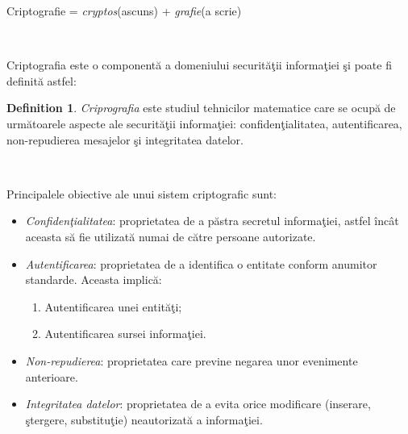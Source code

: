 \documentclass[11pt]{report}
\theoremstyle{plain}
\theoremstyle{definition}
\newtheorem{definition}{Definition}
\theoremstyle{definition}
\theoremstyle{proposition}
\begin{document}
\begin{center}
Criptografie = \textit{cryptos}(ascuns) + \textit{grafie}(a scrie)
\end{center}
\

Criptografia este o componentă a domeniului securităţii informaţiei şi poate fi definită astfel:

\begin{definition} \textit{Criprografia} este studiul tehnicilor matematice care se ocupă de următoarele aspecte ale securităţii informaţiei: confidenţialitatea, autentificarea, non-repudierea mesajelor şi integritatea datelor.
\end{definition}
\

Principalele obiective ale unui sistem criptografic sunt:
\begin{itemize}
	\item \textit{Confidenţialitatea}: proprietatea de a păstra secretul informaţiei, astfel încât aceasta să fie utilizată numai de către persoane autorizate.
	\item \textit{Autentificarea}: proprietatea de a identifica o entitate conform anumitor standarde. Aceasta implică:		
	\begin{enumerate}
		\item Autentificarea unei entităţi;
		\item Autentificarea sursei informaţiei.
	\end{enumerate}
	\item \textit{Non-repudierea}: proprietatea care previne negarea unor evenimente anterioare.
	\item \textit{Integritatea datelor}: proprietatea de a evita orice modificare (inserare, ştergere, substituţie) neautorizată a informaţiei.
\
\end{itemize}


\newpage

\nocite{*}



\end{document}
